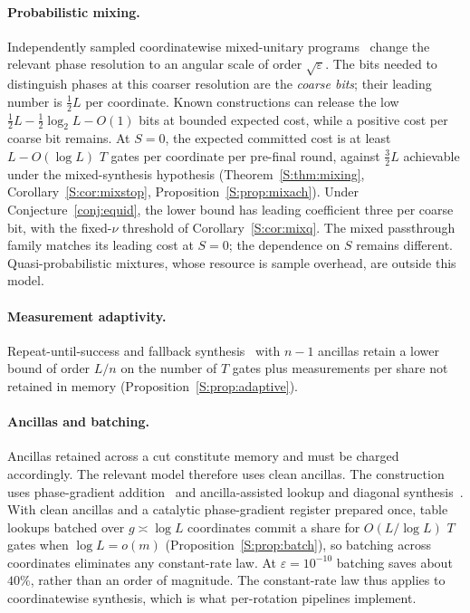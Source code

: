 \documentclass[aps,prx,twocolumn,superscriptaddress,nofootinbib,longbibliography]{revtex4-2}
\theoremstyle{plain}
\theoremstyle{definition}
\theoremstyle{remark}
\begin{document}
\paragraph{Probabilistic mixing.} Independently sampled coordinatewise mixed-unitary programs~\cite{Campbell17,Hastings17,KLMPP,Bothe} change the relevant phase resolution to an angular scale of order $\sqrt\varepsilon$. The bits needed to distinguish phases at this coarser resolution are the \emph{coarse bits}; their leading number is $\tfrac12L$ per coordinate. Known constructions can release the low $\tfrac12L-\tfrac12\log_2L-O(1)$ bits at bounded expected cost, while a positive cost per coarse bit remains. At $S=0$, the expected committed cost is at least $L-O(\log L)$ $T$ gates per coordinate per pre-final round, against $\tfrac32L$ achievable under the mixed-synthesis hypothesis (Theorem~\ref{S:thm:mixing}, Corollary~\ref{S:cor:mixstop}, Proposition~\ref{S:prop:mixach}). Under Conjecture~\ref{conj:equid}, the lower bound has leading coefficient three per coarse bit, with the fixed-$\nu$ threshold of Corollary~\ref{S:cor:mixq}. The mixed passthrough family matches its leading cost at $S=0$; the dependence on $S$ remains different. Quasi-probabilistic mixtures, whose resource is sample overhead, are outside this model.

\paragraph{Measurement adaptivity.} Repeat-until-success and fallback synthesis~\cite{PaetznickSvore,BRS,PQF} with $n-1$ ancillas retain a lower bound of order $L/n$ on the number of $T$ gates plus measurements per share not retained in memory (Proposition~\ref{S:prop:adaptive}).

\paragraph{Ancillas and batching.} Ancillas retained across a cut constitute memory and must be charged accordingly. The relevant model therefore uses clean ancillas. The construction uses phase-gradient addition~\cite{JonesFourier,Gidney} and ancilla-assisted lookup and diagonal synthesis~\cite{LKS,GKW}. With clean ancillas and a catalytic phase-gradient register prepared once, table lookups batched over $g\asymp\log L$ coordinates commit a share for $O(L/\log L)$ $T$ gates when $\log L=o(m)$ (Proposition~\ref{S:prop:batch}), so batching across coordinates eliminates any constant-rate law. At $\varepsilon=10^{-10}$ batching saves about $40\%$, rather than an order of magnitude. The constant-rate law thus applies to coordinatewise synthesis, which is what per-rotation pipelines implement.
\end{document}

